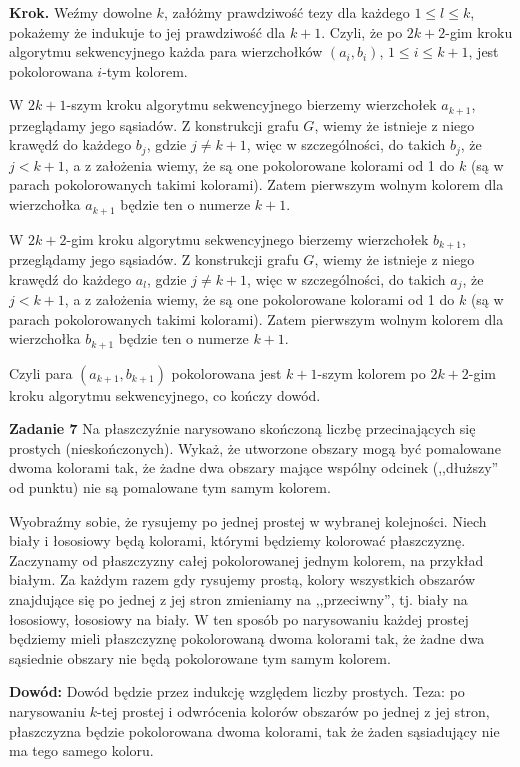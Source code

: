 \documentclass[12pt,a4paper]{article}
\begin{document}
\textbf{Krok.} Weźmy dowolne \(k\), załóżmy prawdziwość tezy dla każdego \( 1 \leq l \leq k\), pokażemy że indukuje to jej prawdziwość dla \(k+1\). Czyli, że po \(2k+2\)-gim kroku algorytmu sekwencyjnego każda para wierzchołków \( (a_i, b_i) \), \( 1 \leq i \leq k+1\), jest pokolorowana \(i\)-tym kolorem.

W \(2k+1\)-szym kroku algorytmu sekwencyjnego bierzemy wierzchołek \(a_{k+1}\), przeglądamy jego sąsiadów. Z konstrukcji grafu \(G\), wiemy że istnieje z niego krawędź do każdego \(b_j\), gdzie \(j \neq k+1\), więc w szczególności, do takich \(b_j\), że \(j < k+1\), a z założenia wiemy, że są one pokolorowane kolorami od 1 do \(k\) (są w parach pokolorowanych takimi kolorami). Zatem pierwszym wolnym kolorem dla wierzchołka \(a_{k+1}\) będzie ten o numerze \(k+1\).

W \(2k+2\)-gim kroku algorytmu sekwencyjnego bierzemy wierzchołek \(b_{k+1}\), przeglądamy jego sąsiadów. Z konstrukcji grafu \(G\), wiemy że istnieje z niego krawędź do każdego \(a_l\), gdzie \(j \neq k+1\), więc w szczególności, do takich \(a_j\), że \(j < k+1\), a z założenia wiemy, że są one pokolorowane kolorami od 1 do \(k\) (są w parach pokolorowanych takimi kolorami). Zatem pierwszym wolnym kolorem dla wierzchołka \(b_{k+1}\) będzie ten o numerze \(k+1\).

Czyli para \( (a_{k+1},b_{k+1}) \) pokolorowana jest \(k+1\)-szym kolorem po \(2k+2\)-gim kroku algorytmu sekwencyjnego, co kończy dowód.

\vskip 1cm
\noindent
\textbf{Zadanie 7} Na płaszczyźnie narysowano skończoną liczbę przecinających się prostych (nieskończonych). Wykaż, że utworzone obszary mogą być pomalowane dwoma kolorami tak, że żadne dwa obszary mające wspólny odcinek (,,dłuższy'' od punktu) nie są pomalowane tym samym kolorem.
\vskip 0.2cm

Wyobraźmy sobie, że rysujemy po jednej prostej w wybranej kolejności. Niech biały i łososiowy będą kolorami, którymi będziemy kolorować płaszczyznę. Zaczynamy od płaszczyzny całej pokolorowanej jednym kolorem, na przykład białym. Za każdym razem gdy rysujemy prostą, kolory wszystkich obszarów znajdujące się po jednej z jej stron zmieniamy na ,,przeciwny'', tj. biały na łososiowy, łososiowy na biały. W ten sposób po narysowaniu każdej prostej będziemy mieli płaszczyznę pokolorowaną dwoma kolorami tak, że żadne dwa sąsiednie obszary nie będą pokolorowane tym samym kolorem. 

\textbf{Dowód:} Dowód będzie przez indukcję względem liczby prostych. Teza: po narysowaniu \(k\)-tej prostej i odwrócenia kolorów obszarów po jednej z jej stron, płaszczyzna będzie pokolorowana dwoma kolorami, tak że żaden sąsiadujący nie ma tego samego koloru.
\end{document}
